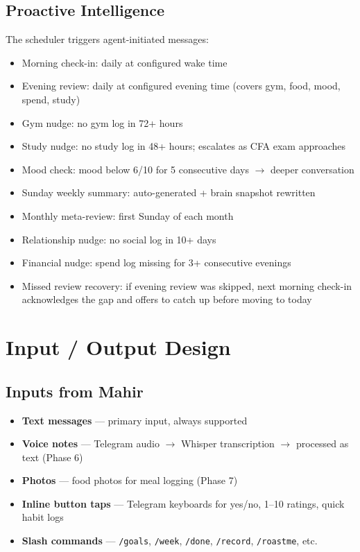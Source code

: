 \documentclass[12pt, a4paper]{article}
\begin{document}
\subsection{Proactive Intelligence}

The scheduler triggers agent-initiated messages:

\begin{itemize}[noitemsep]
    \item Morning check-in: daily at configured wake time
    \item Evening review: daily at configured evening time (covers gym, food, mood, spend, study)
    \item Gym nudge: no gym log in 72+ hours
    \item Study nudge: no study log in 48+ hours; escalates as CFA exam approaches
    \item Mood check: mood below 6/10 for 5 consecutive days $\rightarrow$ deeper conversation
    \item Sunday weekly summary: auto-generated + brain snapshot rewritten
    \item Monthly meta-review: first Sunday of each month
    \item Relationship nudge: no social log in 10+ days
    \item Financial nudge: spend log missing for 3+ consecutive evenings
    \item Missed review recovery: if evening review was skipped, next morning check-in acknowledges the gap and offers to catch up before moving to today
\end{itemize}

\section{Input / Output Design}

\subsection{Inputs from Mahir}

\begin{itemize}[noitemsep]
    \item \textbf{Text messages} --- primary input, always supported
    \item \textbf{Voice notes} --- Telegram audio $\rightarrow$ Whisper transcription $\rightarrow$ processed as text (Phase 6)
    \item \textbf{Photos} --- food photos for meal logging (Phase 7)
    \item \textbf{Inline button taps} --- Telegram keyboards for yes/no, 1--10 ratings, quick habit logs
    \item \textbf{Slash commands} --- \texttt{/goals}, \texttt{/week}, \texttt{/done}, \texttt{/record}, \texttt{/roastme}, etc.
\end{itemize}
\end{document}
